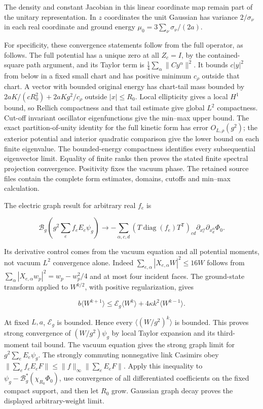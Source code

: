 The density and constant Jacobian in this linear coordinate map remain
part of the unitary representation. In \(z\) coordinates the unit
Gaussian has variance \(2/\sigma_\nu\) in each real coordinate and
ground energy \(\mu_0=3\sum_\nu\sigma_\nu/(2a)\).

For specificity, these convergence statements follow from the full
operator, as follows. The full potential has a unique zero at all
\(Z_c=I\), by the contained-square path argument, and its Taylor term is
\(\frac14\sum_\alpha\|Cy^\alpha\|^2\). It bounds \(c|y|^2\) from below
in a fixed small chart and has positive minimum \(c_\rho\) outside that
chart. A vector with bounded original energy has chart-tail mass bounded
by \(2aK/(cR_0^2)+2aKg^2/c_\rho\) outside \(|x|\le R_0\). Local
ellipticity gives a local \(H^1\) bound, so Rellich compactness and that
tail estimate give global \(L^2\) compactness. Cut-off invariant
oscillator eigenfunctions give the min--max upper bound. The exact
partition-of-unity identity for the full kinetic form has error
\(O_{L,\rho}(g^2)\); the exterior potential and interior quadratic
comparison give the lower bound on each finite eigenvalue. The
bounded-energy compactness identifies every subsequential eigenvector
limit. Equality of finite ranks then proves the stated finite spectral
projection convergence. Positivity fixes the vacuum phase. The retained
source files contain the complete form estimates, domains, cutoffs and
min--max calculation.

The electric graph result for arbitrary real \(f_e\) is

\[
\mathcal B_g\left(g^2\sum_ef_eE_e\psi_g\right)
 \longrightarrow
 -\sum_{\alpha,c,d}(T\operatorname{diag}(f_e)T^{\mathsf T})_{cd}
              \partial_{x_c^\alpha}\partial_{x_d^\alpha}\Phi_0 .
\]

Its derivative control comes from the vacuum equation and all potential
moments, not vacuum \(L^2\) convergence alone. Indeed
\(\sum_{e,\alpha}|X_{e,\alpha}W|^2\le16W\) follows from
\(\sum_\alpha|X_{e,\alpha}w_p|^2=w_p-w_p^2/4\) and at most four incident
faces. The ground-state transform applied to \(W^{k/2}\), with positive
regularization, gives

\[
b\langle W^{k+1}\rangle
 \le\mathcal E_g\langle W^k\rangle+4\kappa k^2\langle W^{k-1}\rangle.
\]

At fixed \(L,a\), \(\mathcal E_g\) is bounded. Hence every
\(\langle(W/g^2)^k\rangle\) is bounded. This proves strong convergence
of \((W/g^2)\psi_g\) by local Taylor expansion and its third-moment tail
bound. The vacuum equation gives the strong graph limit for
\(g^2\sum_eE_e\psi_g\). The strongly commuting nonnegative link Casimirs
obey \(\|\sum_ef_eE_eF\|\le\|f\|_\infty\|\sum_eE_eF\|\). Apply this
inequality to \(\psi_g-\mathcal B_g^*(\chi_{R_0}\Phi_0)\), use
convergence of all differentiated coefficients on the fixed compact
support, and then let \(R_0\) grow. Gaussian graph decay proves the
displayed arbitrary-weight limit.

